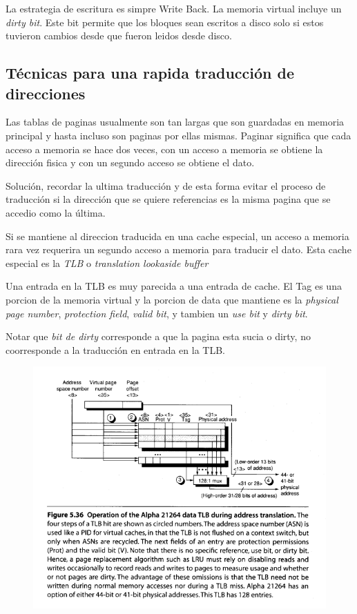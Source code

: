 \documentclass{article}
\begin{document}
La estrategia de escritura es simpre Write Back. La memoria virtual incluye un \textit{dirty bit}. Este bit permite que los bloques sean escritos a disco solo si estos tuvieron cambios desde que fueron leidos desde disco.

\newpage
\subsection{Técnicas para una rapida traducción de direcciones}

Las tablas de paginas usualmente son tan largas que son guardadas en memoria principal y hasta incluso son paginas por ellas mismas. Paginar significa que cada acceso a memoria se hace dos veces, con un acceso a memoria se obtiene la dirección fisica y con un segundo acceso se obtiene el dato.

Solución, recordar la ultima traducción y de esta forma evitar el proceso de traducción si la dirección que se quiere referencias es la misma pagina que se accedio como la última.

Si se mantiene al direccion traducida en una cache especial, un acceso a memoria rara vez requerira un segundo acceso a memoria para traducir el dato. Esta cache especial es la \textit{TLB} o \textit{translation lookaside buffer}

Una entrada en la TLB es muy parecida a una entrada de cache. El Tag es una porcion de la memoria virtual y la porcion de data que mantiene es la \textit{physical page number}, \textit{protection field}, \textit{valid bit}, y tambien un \textit{use bit} y \textit{dirty bit}.

Notar que \textit{bit de dirty} corresponde a que la pagina esta sucia o dirty, no coorresponde a la traducción en entrada en la TLB.

\begin{figure}[h!]
    \includegraphics[width=\linewidth]{imagenes/TLB.png}
\end{figure}
\end{document}
